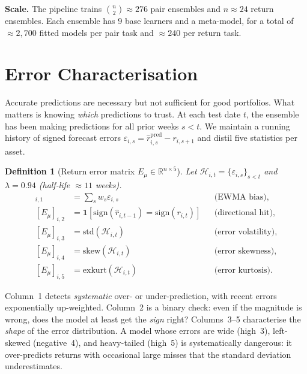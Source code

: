 \documentclass[10pt,twocolumn]{article}
\newcommand{\R}{\mathbb{R}}
\newcommand{\sign}{\mathrm{sign}}
\newtheorem{definition}{Definition}
\begin{document}
\textbf{Scale.}
The pipeline trains $\binom{n}{2}\approx 276$ pair ensembles and
$n\approx 24$ return ensembles.  Each ensemble has 9 base learners
and a meta-model, for a total of $\approx 2{,}700$ fitted models
per pair task and $\approx 240$ per return task.

\FloatBarrier
\section{Error Characterisation}\label{sec:error}

Accurate predictions are necessary but not sufficient for good
portfolios.  What matters is knowing \emph{which} predictions to
trust.  At each test date $t$, the ensemble has been making
predictions for all prior weeks $s<t$.  We maintain a running
history of signed forecast errors
$\varepsilon_{i,s}=\hat r_{i,s}^{\mathrm{pred}}-r_{i,s+1}$
and distil five statistics per asset.

\begin{definition}[Return error matrix $E_\mu\in\R^{n\times 5}$]
\label{def:Emu}
Let $\mathcal{H}_{i,t}=\{\varepsilon_{i,s}\}_{s<t}$ and
$\lambda=0.94$ (half-life $\approx 11$ weeks).
\begin{align}
[E_\mu]_{i,1} &= \textstyle\sum_s w_s\varepsilon_{i,s}
  &&\text{(EWMA bias)},\label{eq:emu1}\\
[E_\mu]_{i,2} &= \mathbf{1}[\sign(\hat r_{i,t-1}){=}\sign(r_{i,t})]
  &&\text{(directional hit)},\label{eq:emu2}\\
[E_\mu]_{i,3} &= \mathrm{std}(\mathcal{H}_{i,t})
  &&\text{(error volatility)},\label{eq:emu3}\\
[E_\mu]_{i,4} &= \mathrm{skew}(\mathcal{H}_{i,t})
  &&\text{(error skewness)},\label{eq:emu4}\\
[E_\mu]_{i,5} &= \mathrm{exkurt}(\mathcal{H}_{i,t})
  &&\text{(error kurtosis)}.\label{eq:emu5}
\end{align}
\end{definition}

Column~1 detects \emph{systematic} over- or under-prediction, with
recent errors exponentially up-weighted.  Column~2 is a binary check:
even if the magnitude is wrong, does the model at least get the
\emph{sign} right?  Columns~3--5 characterise the \emph{shape} of
the error distribution.  A model whose errors are wide (high~3),
left-skewed (negative~4), and heavy-tailed (high~5) is
systematically dangerous: it over-predicts returns with occasional
large misses that the standard deviation underestimates.
\end{document}
